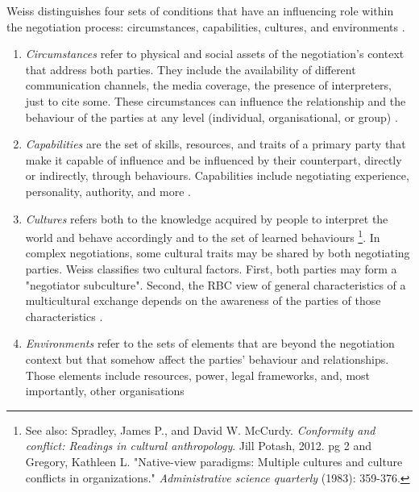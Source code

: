 \documentclass[../main.tex]{subfiles}
\begin{document}
Weiss distinguishes four sets of conditions that have an influencing role within the negotiation process: circumstances, capabilities, cultures, and environments \autocite[287]{weiss}.
\begin{enumerate}
    \item \textit{Circumstances} refer to physical and social assets of the negotiation's context that address both parties. They include the availability of different communication channels, the media coverage, the presence of interpreters, just to cite some. These circumstances can influence the relationship and the behaviour of the parties at any level (individual, organisational, or group) \autocite[287]{weiss}.
    \item \textit{Capabilities} are the set of skills, resources, and traits of a primary party that make it capable of influence and be influenced by their counterpart, directly or indirectly, through behaviours. Capabilities include negotiating experience, personality, authority, and more \autocite[288]{weiss}.
    \item \textit{Cultures} refers both to the knowledge acquired by people to interpret the world and behave accordingly and to the set of learned behaviours \autocite[288]{weiss}\footnote{See also: Spradley, James P., and David W. McCurdy. \textit{Conformity and conflict: Readings in cultural anthropology}. Jill Potash, 2012. pg 2  and\\
    Gregory, Kathleen L. "Native-view paradigms: Multiple cultures and culture conflicts in organizations." \textit{Administrative science quarterly} (1983): 359-376.}.
    In complex negotiations, some cultural traits may be shared by both negotiating parties. Weiss classifies two cultural factors. First, both parties may form a "negotiator subculture". Second, the RBC view of general characteristics of a multicultural exchange depends on the awareness of the parties of those characteristics \autocite[289]{weiss}.
   \item \textit{Environments} refer to the sets of elements that are beyond the negotiation context but that somehow affect the parties' behaviour and relationships. Those elements include resources, power, legal frameworks, and, most importantly, other organisations 
\end{enumerate}
\end{document}
